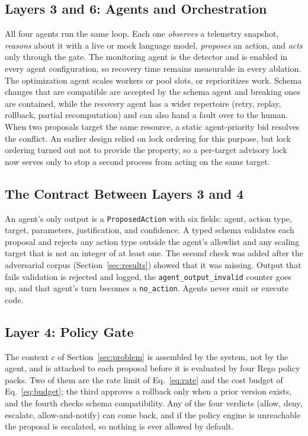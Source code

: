 \subsection{Layers 3 and 6: Agents and Orchestration}
All four agents run the same loop. Each one \emph{observes} a telemetry snapshot, \emph{reasons}
about it with a live or mock language model, \emph{proposes} an action, and \emph{acts} only through
the gate. The monitoring agent is the
detector and is enabled in every agent configuration, so recovery time remains measurable in every
ablation. The optimization agent scales workers or pool slots, or reprioritizes work. Schema changes
that are compatible are accepted by the schema agent and breaking ones are contained, while the
recovery agent has a wider repertoire (retry, replay, rollback, partial recomputation) and can also
hand a fault over to the human. When two proposals target the same
resource, a static agent-priority bid resolves the conflict. An earlier design relied on lock ordering
for this purpose, but lock ordering turned out not to provide the property, so a per-target advisory
lock now serves only to stop a second process from acting on the same target.

\subsection{The Contract Between Layers 3 and 4}
An agent's only output is a \texttt{ProposedAction} with six fields: agent, action type, target,
parameters, justification, and confidence. A typed schema validates each proposal and rejects any
action type outside the agent's allowlist and any scaling target that is not an integer of at least
one. The second check was added after the adversarial corpus (Section~\ref{sec:results}) showed that
it was missing. Output that fails validation is rejected and logged, the
\texttt{agent\_output\_invalid} counter goes up, and that agent's turn becomes a \texttt{no\_action}.
Agents never emit or execute code.

\subsection{Layer 4: Policy Gate}
The context $c$ of Section~\ref{sec:problem} is assembled by the system, not by the agent, and is
attached to each proposal before it is evaluated by four Rego policy packs. Two of them are the rate
limit of Eq.~\eqref{eq:rate} and the cost budget of Eq.~\eqref{eq:budget}; the third approves a
rollback only when a prior version exists, and the fourth checks schema compatibility. Any of the four
verdicts (allow, deny, escalate, allow-and-notify) can come back, and if the policy engine is
unreachable the proposal is escalated, so nothing is ever allowed by default.

